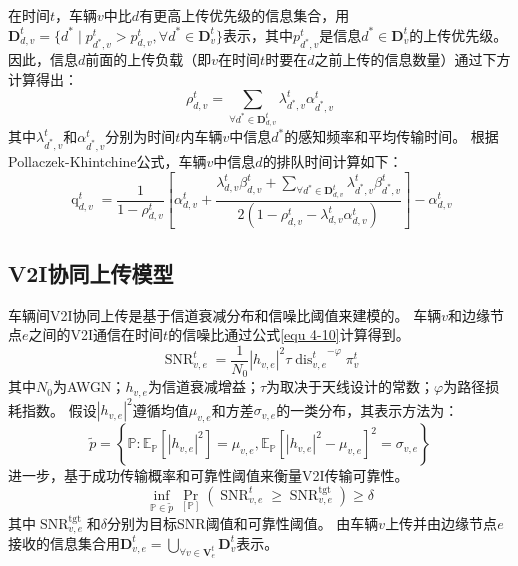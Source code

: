在时间$t$，车辆$v$中比$d$有更高上传优先级的信息集合，用$\mathbf{D}_{d, v}^t = \{ d^* \mid p_{d^*, v}^{t} > p_{d, v}^{t} , \forall d^* \in \mathbf{D}_v^t \}$表示，其中$p_{d^*, v}^{t}$是信息$d^* \in \mathbf{D}_v^t$的上传优先级。
因此，信息$d$前面的上传负载（即$v$在时间$t$时要在$d$之前上传的信息数量）通过下方计算得出： 
\begin{equation}
	\rho_{d, v}^{t}=\sum_{\forall d^* \in \mathbf{D}_{d, v}^t} \lambda_{d^*, v}^t \alpha_{d^*, v}^t
\end{equation}
其中$\lambda_{d^*, v}^t$和$\alpha_{d^*, v}^t$分别为时间$t$内车辆$v$中信息$d^*$的感知频率和平均传输时间。
根据Pollaczek-Khintchine公式\cite{takine2001queue}，车辆$v$中信息$d$的排队时间计算如下：
\begin{equation}
    \operatorname{q}_{d, v}^t= \frac{1} {1 - \rho_{d, v}^{t}} 
        \left[ \alpha_{d, v}^t + \frac{ \lambda_{d, v}^{t} \beta_{d, v}^t + \sum\limits_{\forall d^* \in \mathbf{D}_{d, v}^t} \lambda_{d^*, v}^t \beta_{d^*, v}^t }{2\left(1-\rho_{d, v}^{t} - \lambda_{d, v}^{t} \alpha_{d, v}^t\right)}\right] 
        - \alpha_{d, v}^t
\end{equation}

\subsection[\hspace{-2pt}V2I协同上传模型]{{ \hspace{-8pt}V2I协同上传模型}}

车辆间V2I协同上传是基于信道衰减分布和信噪比阈值来建模的。
车辆$v$和边缘节点$e$之间的V2I通信在时间$t$的信噪比通过公式\ref{equ 4-10}\cite{sadek2009distributed}计算得到。
\begin{equation}
    \operatorname{SNR}_{v, e}^{t}=\frac{1}{N_{0}} \left|h_{v, e}\right|^{2} \tau {\operatorname{dis}_{v, e}^{t}}^{-\varphi} {\pi}_v^t
    \label{equ 4-10}
\end{equation}
其中$N_{0}$为AWGN；$h_{v, e}$为信道衰减增益；$\tau$为取决于天线设计的常数；$\varphi$为路径损耗指数。
假设$\left|h_{v, e}\right|^{2}$遵循均值$\mu_{v, e}$和方差$\sigma_{v, e}$的一类分布，其表示方法为：
\begin{equation}
    \tilde{p}=\left\{\mathbb{P}: \mathbb{E}_{\mathbb{P}}\left[\left|h_{v, e}\right|^{2}\right]=\mu_{v, e}, \mathbb{E}_{\mathbb{P}}\left[\left|h_{v, e}\right|^{2}-\mu_{v, e}\right]^{2}=\sigma_{v, e}\right\}
\end{equation}
进一步，基于成功传输概率和可靠性阈值来衡量V2I传输可靠性。
\begin{equation}
    \inf_{\mathbb{P} \in \tilde{p}} \operatorname{Pr}_{[\mathbb{P}]}\left(\operatorname{SNR}_{v, e}^{t} \geq \operatorname{SNR}_{v, e}^{\operatorname{tgt}}\right) \geq \delta
\end{equation}
\noindent 其中$\operatorname{SNR}_{v, e}^{\operatorname{tgt}}$和$\delta$分别为目标SNR阈值和可靠性阈值。
由车辆$v$上传并由边缘节点$e$接收的信息集合用$\mathbf{D}_{v, e}^{t} = \bigcup_{\forall v \in \mathbf{V}_{e}^{t}} \mathbf{D}_{v}^{t}$表示。

